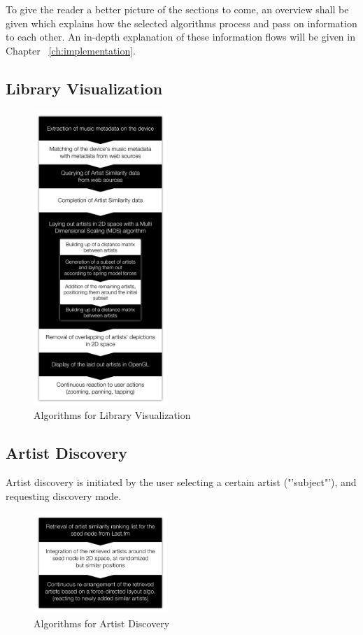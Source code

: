 To give the reader a better picture of the sections to come, an overview shall be given which explains how the selected algorithms process and pass on information to each other. An in-depth explanation of these information flows will be given in Chapter ~\ref{ch:implementation}.

\subsection{Library Visualization}

\begin{figure}[H]
  \centering
    \includegraphics[width=0.45\textwidth]{figures/algorithm_flow_visualization}
  \caption{Algorithms for Library Visualization}
  \label{fig:algorithm_flow_visualization}
\end{figure}

\subsection{Artist Discovery}

Artist discovery is initiated by the user selecting a certain artist ("'subject"'), and requesting discovery mode.

\begin{figure}[H]
  \centering
    \includegraphics[width=0.45\textwidth]{figures/algorithm_flow_artist_discovery}
  \caption{Algorithms for Artist Discovery}
  \label{fig:algorithm_flow_artist_discovery}
\end{figure}

